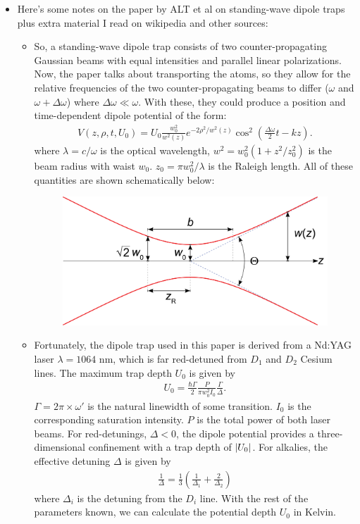 \documentclass{book}
\theoremstyle{definition}
\newcommand{\f}[2]{\frac{#1}{#2}}
\newcommand{\lp}{\left(}
\newcommand{\rp}{\right)}
\begin{document}
\begin{itemize}
	\item Here's some notes on the paper by ALT et al on standing-wave dipole traps plus extra material I read on wikipedia and other sources:
	\begin{itemize}
		\item So, a standing-wave dipole trap consists of two counter-propagating Gaussian beams with equal intensities and parallel linear polarizations. Now, the paper talks about transporting the atoms, so they allow for the relative frequencies of the two counter-propagating beams to differ ($\omega$ and $\omega + \Delta \omega$) where $\Delta \omega \ll \omega$. With these, they could produce a position and time-dependent dipole potential of the form:
		\begin{align}
		V(z,\rho,t,U_0) = U_0 \f{w_0^2}{w^2(z)}e^{-2\rho^2/w^2(z)}\cos^2\lp \f{\Delta \omega}{2}t - kz \rp.
		\end{align}
		where $\lambda = c/\omega$ is the optical wavelength, $w^2 = w_0^2(1 + z^2/z_0^2)$ is the beam radius with waist $w_0$. $z_0 = \pi w_0^2 / \lambda$ is the Raleigh length. All of these quantities are shown schematically below:
		\begin{figure}[!htb]
			\centering
			\includegraphics[scale=0.05]{gauss.png}
		\end{figure}
	
		\item Fortunately, the dipole trap used in this paper is derived from a Nd:YAG laser $\lambda = 1064$ nm, which is far red-detuned from $D_1$ and $D_2$ Cesium lines. The maximum trap depth $U_0$ is given by
		\begin{align}
		U_0 = \f{\hbar \Gamma}{2}\f{P}{\pi w_0^2 I_0}\f{\Gamma}{\Delta}.
		\end{align}
		$\Gamma = 2\pi \times \omega'$ is the natural linewidth of some transition. $I_0$ is the corresponding saturation intensity. $P$ is the total power of both laser beams. For red-detunings, $\Delta < 0$, the dipole potential provides a three-dimensional confinement with a trap depth of $\abs{U_0}$. For alkalies, the effective detuning $\Delta$ is given by
		\begin{align}
		\f{1}{\Delta} = \f{1}{3}\lp \f{1}{\Delta_1} + \f{2}{\Delta_2} \rp
		\end{align}
		where $\Delta_i$ is the detuning from the $D_i$ line. With the rest of the parameters known, we can calculate the potential depth $U_0$ in Kelvin.
		 

\end{itemize}
\end{itemize}
\end{document}
